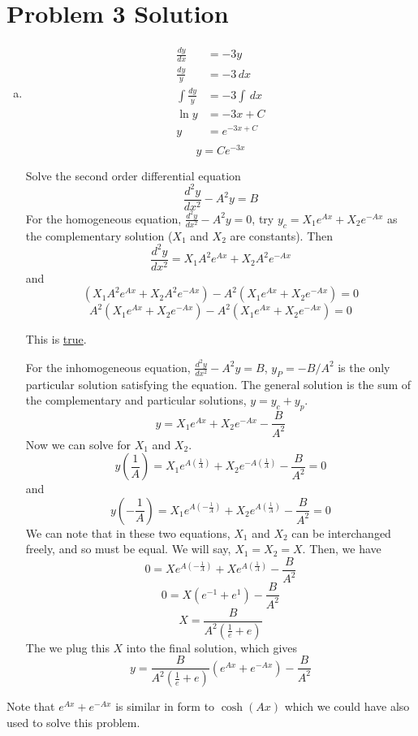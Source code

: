 \documentclass{report}
\begin{document}
\section*{Problem 3 Solution}
\begin{enumerate}[a)]
\item 
\begin{align}
\frac{dy}{dx}	&= -3y \\
\frac{dy}{y} 	& = -3\,dx \\
\int\frac{dy}{y}&= -3 \int \,dx \\
\ln y			&= -3 x + C \\
y				&= e^{-3x + C} \\
\end{align}
$$\boxed{y = Ce^{-3x}}$$

Solve the second order differential equation
$$ \frac{d^2 y}{dx^2} - A^2y = B $$
For the homogeneous equation, $\frac{d^2 y}{dx^2} - A^2y = 0$, try $y_c = X_1 e^{Ax} + X_2 e^{-Ax}$ as the complementary solution ($X_1$ and $X_2$ are constants). Then
$$ \frac{d^2 y}{dx^2} = X_1 A^2 e^{Ax} + X_2 A^2 e^{-Ax} $$
and
$$ (X_1 A^2 e^{Ax} + X_2 A^2 e^{-Ax}) - A^2(X_1 e^{Ax} + X_2 e^{-Ax}) = 0 $$
$$ A^2 (X_1 e^{Ax} + X_2 e^{-Ax}) - A^2 (X_1 e^{Ax} + X_2 e^{-Ax}) = 0 $$

This is \underline{true}.

For the inhomogeneous equation, $\frac{d^2 y}{dx^2} - A^2y = B$, $y_P = -B/A^2$ is the only particular solution satisfying the equation. The general solution is the sum of the complementary and particular solutions, $y = y_c + y_p$. 
$$ y = X_1 e^{Ax} + X_2 e^{-Ax} - \frac{B}{A^2} $$
Now we can solve for $X_1$ and $X_2$. 
$$ y(\frac{1}{A}) = X_1 e^{A(\frac{1}{A})} + X_2 e^{-A(\frac{1}{A})} - \frac{B}{A^2} = 0 $$
and
$$ y(-\frac{1}{A}) = X_1 e^{A(-\frac{1}{A})} + X_2 e^{A(\frac{1}{A})} - \frac{B}{A^2} = 0 $$
We can note that in these two equations, $X_1$ and $X_2$ can be interchanged freely, and so must be equal. We will say, $X_1 = X_2 = X$. Then, we have
$$ 0 = X e^{A(-\frac{1}{A})} + X e^{A(\frac{1}{A})} - \frac{B}{A^2} $$
$$ 0 = X (e^{-1} + e^{1}) - \frac{B}{A^2} $$
$$ X = \frac{B}{A^2(\frac{1}{e} + e)} $$
The we plug this $X$ into the final solution, which gives
$$ y = \frac{B}{A^2(\frac{1}{e} + e)} (e^{Ax} + e^{-Ax}) - \frac{B}{A^2} $$
\end{enumerate}
Note that $e^{Ax} + e^{-Ax}$ is similar in form to $\cosh(Ax)$ which we could have also used to solve this problem.
\end{document}
